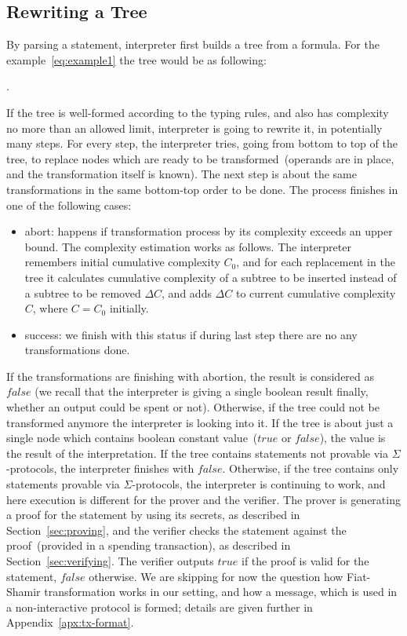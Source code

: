 \documentclass[11pt]{llncs}
\newcommand{\authnote}[2]{\marginpar{\parbox{\marginparwidth}{\tiny %
  \textsf{#1 {\textcolor{blue}{notes: #2}}}}}%
  \textcolor{blue}{\textbf{\dag}}}
\newcommand{\authnote}[2]{
  \textsf{#1 \textcolor{blue}{: #2}}}
\newcommand{\authnote}[2]{}
\newcommand{\knote}[1]{{\authnote{\textcolor{green}{kushti notes}}{#1}}}
\begin{document}
\subsection{Rewriting a Tree}
\label{sec:rewriting}

By parsing a statement, interpreter first builds a tree from a formula. For the example~\ref{eq:example1} the tree would be as following:

\knote{draw the tree}.

If the tree is well-formed according to the typing rules, and also has complexity no more than an allowed limit, interpreter is going to rewrite it, in potentially many steps. For every step, the interpreter tries, going from bottom to top of the tree, to replace nodes which are ready to be transformed~(operands are in place, and the transformation itself is known). The next step is about the same transformations in the same bottom-top order to be done. The process finishes in one of the following cases:

\begin{itemize}
    \item{abort: } happens if transformation process by its complexity exceeds an upper bound. The complexity estimation works as follows. The interpreter remembers initial cumulative complexity $C_0$, and for each replacement in the tree it calculates cumulative complexity of a subtree to be inserted instead of a subtree to be removed $\Delta C$, and adds $\Delta C$ to current cumulative complexity $C$, where $C = C_0$ initially.  
    \item{success: } we finish with this status if during last step there are no any transformations done.  
\end{itemize} 

If the transformations are finishing with abortion, the result is considered as $false$ (we recall that the interpreter is giving a single boolean result finally, whether an output could be spent or not). Otherwise, if the tree could not be transformed anymore the interpreter is looking into it. If the tree is about just a single node which contains boolean constant value~($true$ or $false$), the value is the result of the interpretation. If the tree contains statements not provable via $\Sigma$-protocols, the interpreter finishes with $false$. Otherwise, if the tree contains only statements provable via $\Sigma$-protocols, the interpreter is continuing to work, and here execution is different for the prover and the verifier. The prover is generating a proof for the statement by using its secrets, as described in Section~\ref{sec:proving}, and the verifier checks the statement against the proof~(provided in a spending transaction), as described in Section~\ref{sec:verifying}. The verifier outputs $true$ if the proof is valid for the statement, $false$ otherwise. We are skipping for now the question how Fiat-Shamir transformation works in our setting, and how a message, which is used in a non-interactive protocol is formed; details are given further in Appendix~\ref{apx:tx-format}. 
\end{document}
